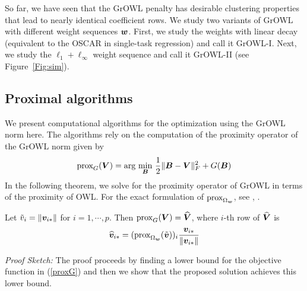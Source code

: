 So far, we have seen that the GrOWL penalty has desirable clustering properties that lead to nearly identical coefficient rows. We study two variants of GrOWL with different weight sequences $\boldsymbol{w}$. First, we study the weights with linear decay (equivalent to the OSCAR in single-task regression) and call it GrOWL-I. Next, we study the $\ell_1 +\ell_{\infty}$ weight sequence and call it GrOWL-II (see Figure~\ref{Fig:sim}). %


    




\subsection{Proximal algorithms}
We present computational algorithms for the optimization using the GrOWL norm here. The algorithms rely on the computation of the proximity operator \cite{prox} of the GrOWL norm given by
\begin{eqnarray}\label{proxG}
\textnormal{prox}_{G}(\bV) = \textnormal{arg} \underset{\bB}{ \textnormal{ min } } \frac{1}{2}\|\bB - \bV\|_F^2 + G(\bB) 
\end{eqnarray}
In the following theorem, we solve for the proximity operator of GrOWL in terms of the proximity of OWL. For the exact formulation of $\textnormal{prox}_{\Omega_{\boldsymbol{w}}}$, see \cite{candes13}, \cite{ZengFigueiredo2014}.

\begin{theorem} Let $\tilde{v}_i = \| \boldsymbol{v}_{i {\ast}}\|$ for $i = 1, \cdots, p$. Then
$\textnormal{prox}_{G}(\boldsymbol{V}) = \widehat {\boldsymbol{V}}$, where $i$-th row of $\widehat {\boldsymbol{V}}$ is
\begin{eqnarray}\label{Vhat}
\widehat \bv_{i \a} =  (\textnormal{prox}_{\Omega_{\bw}}(\tilde{\bv}))_i \frac{\bv_{i\a}}{\|\bv_{i \a}\|}
\end{eqnarray}
\end{theorem}
\textit{Proof Sketch:} The proof proceeds by finding a lower bound for the objective function in (\ref{proxG}) and then we show that the proposed solution achieves this lower bound.



